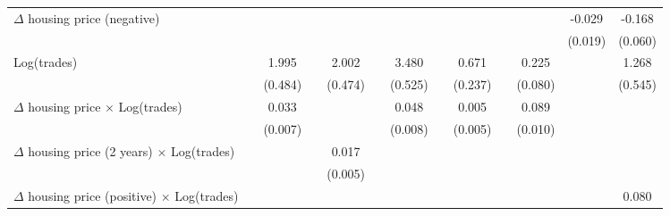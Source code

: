 \begin{sidewaystable}[htbp]
\begin{tabular}{l*{12}{c}}
$\Delta$ housing price (negative)&                    &                    &                    &                    &                    &                    &                    &                    &                    &                    &      -0.029        &      -0.168\sym{**}\\
                    &                    &                    &                    &                    &                    &                    &                    &                    &                    &                    &     (0.019)        &     (0.060)        \\
Log(trades)         &                    &       1.995\sym{**}&                    &       2.002\sym{**}&                    &       3.480\sym{**}&                    &       0.671\sym{**}&                    &       0.225\sym{**}&                    &       1.268\sym{*} \\
                    &                    &     (0.484)        &                    &     (0.474)        &                    &     (0.525)        &                    &     (0.237)        &                    &     (0.080)        &                    &     (0.545)        \\
$\Delta$ housing price $\times$ Log(trades)&                    &       0.033\sym{**}&                    &                    &                    &       0.048\sym{**}&                    &       0.005        &                    &       0.089\sym{**}&                    &                    \\
                    &                    &     (0.007)        &                    &                    &                    &     (0.008)        &                    &     (0.005)        &                    &     (0.010)        &                    &                    \\
$\Delta$ housing price (2 years) $\times$ Log(trades)&                    &                    &                    &       0.017\sym{**}&                    &                    &                    &                    &                    &                    &                    &                    \\
                    &                    &                    &                    &     (0.005)        &                    &                    &                    &                    &                    &                    &                    &                    \\
$\Delta$ housing price (positive) $\times$ Log(trades)&                    &                    &                    &                    &                    &                    &                    &                    &                    &                    &                    &       0.080\sym{**}\\

\end{tabular}
\end{sidewaystable}
